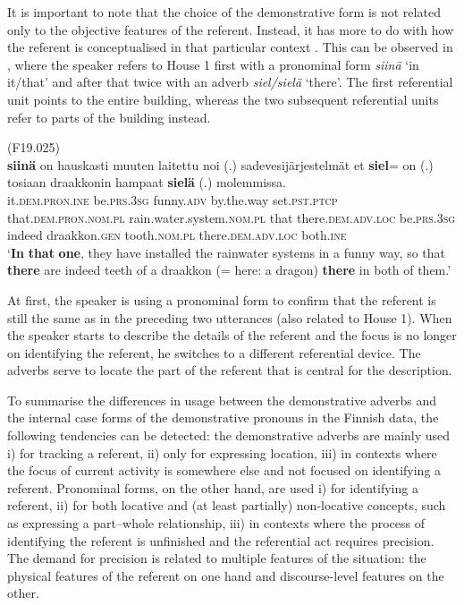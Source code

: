 \documentclass[output=paper,colorlinks,citecolor=brown]{langscibook}
\begin{document}
It is important to note that the choice of the demonstrative form is not related only to the objective features of the referent. Instead, it has more to do with how the referent is conceptualised in that particular context \citep[83-84]{Laury1996}. This can be observed in , where the speaker refers to House 1 first with a pronominal form \textit{siinä} ‘in it/that’ and after that twice with an adverb \textit{siel/sielä} ‘there’. The first referential unit points to the entire building, whereas the two subsequent referential units refer to parts of the building instead.

\ea\label{ex:nahkola:15} (F19.025)\\
\gll \textbf{siinä} on hauskasti muuten laitettu noi (.) sadevesijärjestelmät et \textbf{siel}= on (.) tosiaan draakkonin hampaat \textbf{sielä} (.) molemmissa.\\
     it.\textsc{dem.pron.ine} be.\textsc{prs.3sg} funny.\textsc{adv} by.the.way set.\textsc{pst.ptcp} that.\textsc{dem.pron.nom.pl} {} rain.water.system.\textsc{nom.pl} that there.\textsc{dem.adv.loc} be.\textsc{prs.3sg} {} indeed draakkon.\textsc{gen} tooth.\textsc{nom.pl} there.\textsc{dem.adv.loc} {} both.\textsc{ine}\\
\glt ‘\textbf{In} \textbf{that} \textbf{one}, they have installed the rainwater systems in a funny way, so that \textbf{there} are indeed teeth of a draakkon (= here: a dragon) \textbf{there} in both of them.’ 
\z

At first, the speaker is using a pronominal form to confirm that the referent is still the same as in the preceding two utterances (also related to House 1). When the speaker starts to describe the details of the referent and the focus is no longer on identifying the referent, he switches to a different referential device. The adverbs serve to locate the part of the referent that is central for the description.

To summarise the differences in usage between the demonstrative adverbs and the internal case forms of the demonstrative pronouns in the Finnish data, the following tendencies can be detected: the demonstrative adverbs are mainly used i) for tracking a referent, ii) only for expressing location, iii) in contexts where the focus of current activity is somewhere else and not focused on identifying a referent. Pronominal forms, on the other hand, are used i) for identifying a referent, ii) for both locative and (at least partially) non-locative concepts, such as expressing a part–whole relationship, iii) in contexts where the process of identifying the referent is unfinished and the referential act requires precision. The demand for precision is related to multiple features of the situation: the physical features of the referent on one hand and discourse-level features on the other. 
\end{document}
